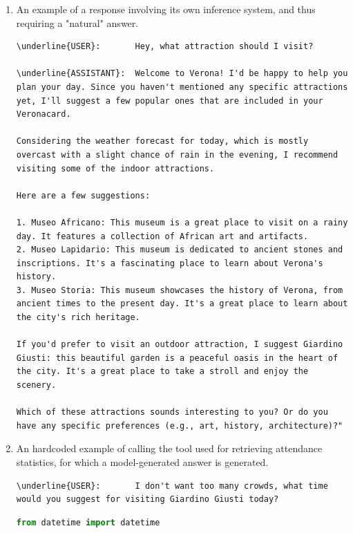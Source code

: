 \begin{enumerate}
    \item An example of a response involving its own inference system, and thus requiring a "natural" answer.

\begin{Verbatim}[breaklines=true]
\underline{USER}:       Hey, what attraction should I visit?

\underline{ASSISTANT}:  Welcome to Verona! I'd be happy to help you plan your day. Since you haven't mentioned any specific attractions yet, I'll suggest a few popular ones that are included in your Veronacard.

Considering the weather forecast for today, which is mostly overcast with a slight chance of rain in the evening, I recommend visiting some of the indoor attractions. 

Here are a few suggestions:
        
1. Museo Africano: This museum is a great place to visit on a rainy day. It features a collection of African art and artifacts.
2. Museo Lapidario: This museum is dedicated to ancient stones and inscriptions. It's a fascinating place to learn about Verona's history.
3. Museo Storia: This museum showcases the history of Verona, from ancient times to the present day. It's a great place to learn about the city's rich heritage.

If you'd prefer to visit an outdoor attraction, I suggest Giardino Giusti: this beautiful garden is a peaceful oasis in the heart of the city. It's a great place to take a stroll and enjoy the scenery.

Which of these attractions sounds interesting to you? Or do you have any specific preferences (e.g., art, history, architecture)?"
    \end{Verbatim}

    \item An hardcoded example of calling the tool used for retrieving attendance statistics, for which a model-generated answer is generated.
    
\begin{Verbatim}[breaklines=true]
\underline{USER}:       I don't want too many crowds, what time would you suggest for visiting Giardino Giusti today?
\end{Verbatim}
\begin{center}
\begin{lstlisting}[language=Python, frame=single, caption=Few-shot on \texttt{retrieve\_affluency()}., label=lst:few-shot-affluency]
from datetime import datetime


\end{lstlisting}
\end{center}
\end{enumerate}
